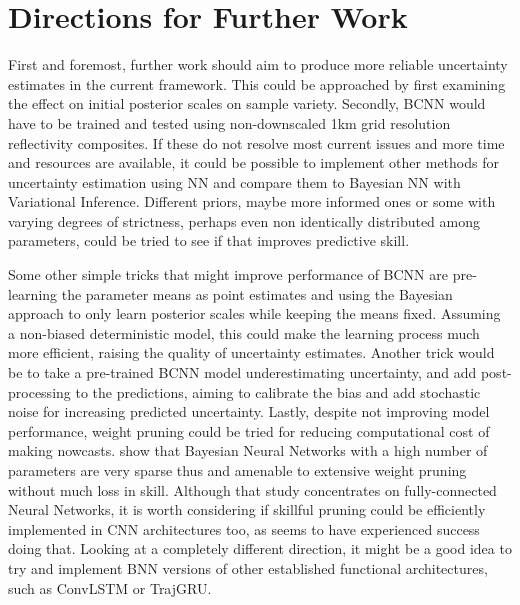 \section{Directions for Further Work}

First and foremost, further work should aim to produce more reliable uncertainty estimates in the current framework. This could be approached by first examining the effect on initial posterior scales on sample variety. Secondly, BCNN would have to be trained and tested using non-downscaled 1km grid resolution reflectivity composites. If these do not resolve most current issues and more time and resources are available, it could be possible to implement other methods for uncertainty estimation using NN and compare them to Bayesian NN with Variational Inference. Different priors, maybe more informed ones or some with varying degrees of strictness, perhaps even non identically distributed among parameters, could be tried to see if that improves predictive skill. 

Some other simple tricks that might improve performance of BCNN are pre-learning the parameter means as point estimates and using the Bayesian approach to only learn posterior scales while keeping the means fixed. Assuming a non-biased deterministic model, this could make the learning process much more efficient, raising the quality of uncertainty estimates. Another trick would be to take a pre-trained BCNN model underestimating uncertainty, and add post-processing to the predictions, aiming to calibrate the bias and add stochastic noise for increasing predicted uncertainty. Lastly, despite not improving model performance, weight pruning could be tried for reducing computational cost of making nowcasts. \citet{blundell_weight_2015} show that Bayesian Neural Networks with a high number of parameters are very sparse thus and amenable to extensive weight pruning without much loss in skill. Although that study concentrates on fully-connected Neural Networks, it is worth considering if skillful pruning could be efficiently implemented in CNN architectures too, as  \citet{shridhar_comprehensive_2019} seems to have experienced success doing that. 
Looking at a completely different direction, it might be a good idea to try and implement BNN versions of other established functional architectures, such as ConvLSTM or TrajGRU. 

